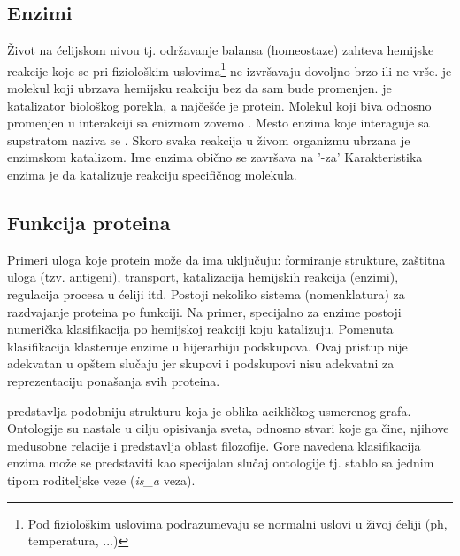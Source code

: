 
\subsection{Enzimi}

Život na ćelijskom nivou tj. održavanje balansa (homeostaze) zahteva hemijske
reakcije koje se pri fiziološkim uslovima\footnote{Pod fiziološkim uslovima
podrazumevaju se normalni uslovi u živoj ćeliji (ph, temperatura, ...)} ne
izvršavaju dovoljno brzo ili ne vrše.
 je molekul koji ubrzava hemijsku reakciju bez da sam bude
promenjen.  je katalizator biološkog porekla, a najčešće je protein.
Molekul koji biva  odnosno promenjen u interakciji sa
enizmom zovemo . Mesto enzima koje interaguje sa
supstratom naziva se .  Skoro svaka reakcija u živom
organizmu ubrzana je enzimskom katalizom. Ime enzima obično se završava na '-za'
Karakteristika enzima je da katalizuje reakciju specifičnog molekula.

\subsection{Funkcija proteina}

Primeri uloga koje protein može da ima uključuju: formiranje
strukture, zaštitna uloga (tzv. antigeni), transport, katalizacija hemijskih
reakcija (enzimi), regulacija procesa u ćeliji itd.  Postoji nekoliko sistema
(nomenklatura) za razdvajanje proteina po funkciji.  Na primer, specijalno za
enzime postoji numerička klasifikacija po hemijskoj reakciji koju katalizuju.
Pomenuta klasifikacija klasteruje enzime u hijerarhiju podskupova. Ovaj pristup
nije adekvatan u opštem slučaju jer skupovi i podskupovi nisu adekvatni za
reprezentaciju ponašanja svih proteina.

 predstavlja podobniju strukturu koja je oblika acikličkog
usmerenog grafa.  Ontologije su nastale u cilju opisivanja sveta, odnosno
stvari koje ga čine, njihove međusobne relacije i predstavlja oblast
filozofije.  Gore navedena klasifikacija enzima može se predstaviti kao
specijalan slučaj ontologije tj. stablo sa jednim tipom roditeljske veze
(\textit{is\_a} veza).

